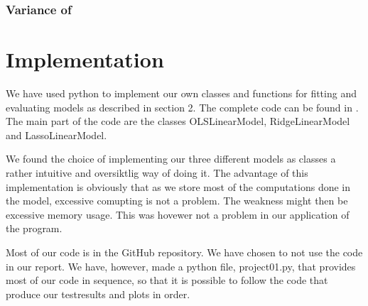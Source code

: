 \documentclass[a4paper,norsk]{article}
\begin{document}
\subsubsection{Variance of \bm{$\beta$}}

\section{Implementation}
We have used python to implement our own classes and functions for 
fitting and evaluating models as described in section 2.  
The complete code can be found in \cite{hastie}. The main part of the code
are the classes OLSLinearModel, RidgeLinearModel and LassoLinearModel. 
\par
We found the choice of implementing our three different models as classes 
a rather intuitive and oversiktlig way of doing it. The advantage of this
implementation is obviously that as we store most of the computations 
done in the model, excessive comupting is not
a problem. The weakness might then be excessive memory usage. This was 
hovewer not a problem in our application of the program. 
\par 
Most of our code is in the GitHub repository. We have chosen to 
not use the code in our report. We have, however, made a python file, 
project01.py, that provides most of our code in sequence, 
so that it is possible to follow the code that produce our testresults 
and plots in order.
\end{document}
